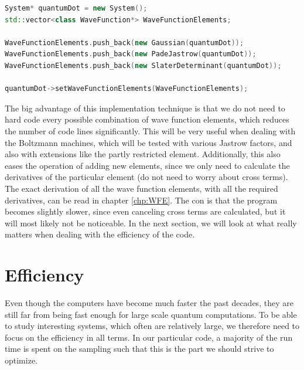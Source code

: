 \lstset{basicstyle=\scriptsize}
\begin{lstlisting}[language=c++,caption={The code was implemented in a flexible way such that all the wave function elements can be combined with other wave function elements by appending all the wanted elements to a vector, here named \texttt{waveFunctionElements}, which again is set as the trial wave function using the function \texttt{setWaveFunctionElements}.}]
System* quantumDot = new System();
std::vector<class WaveFunction*> WaveFunctionElements;

WaveFunctionElements.push_back(new Gaussian(quantumDot));
WaveFunctionElements.push_back(new PadeJastrow(quantumDot));
WaveFunctionElements.push_back(new SlaterDeterminant(quantumDot));

quantumDot->setWaveFunctionElements(WaveFunctionElements);
\end{lstlisting}

The big advantage of this implementation technique is that we do not need to hard code every possible combination of wave function elements, which reduces the number of code lines significantly. This will be very useful when dealing with the Boltzmann machines, which will be tested with various Jastrow factors, and also with extensions like the partly restricted element. Additionally, this also eases the operation of adding new elements, since we only need to calculate the derivatives of the particular element (do not need to worry about cross terms). The exact derivation of all the wave function elements, with all the required derivatives, can be read in chapter \ref{chp:WFE}. The con is that the program becomes slightly slower, since even canceling cross terms are calculated, but it will most likely not be noticeable. In the next section, we will look at what really matters when dealing with the efficiency of the code.

\section{Efficiency}
Even though the computers have become much faster the past decades, they are still far from being fast enough for large scale quantum computations. To be able to study interesting systems, which often are relatively large, we therefore need to focus on the efficiency in all terms. In our particular code, a majority of the run time is spent on the sampling such that this is the part we should strive to optimize.

